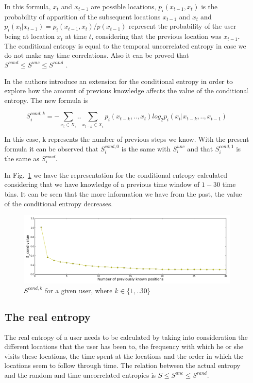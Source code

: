 In this formula, $x_{t}$ and $x_{t-1}$ are possible locations,
$p_{i}(x_{t-1},x_{t})$ is the probability of apparition of the subsequent
locations $x_{t-1}$ and $x_{t}$ and $p_{i}(x_{t}|x_{t-1}) = p_{i}(x_{t-1},x_{t})
/ p(x_{t-1})$ represent the probability of the user being at location $x_{t}$ at
time $t$, considering that the previous location was $x_{t-1}$. The conditional
entropy is equal to the temporal uncorrelated entropy in case we do not make any
time correlations. Also it can be proved that $S^{cond} \leq S^{unc} \leq
S^{rand}$ \cite{Cover:2006:EIT:1146355}.

In \cite{Sinatra14} the authors introduce an extension for the conditional
entropy in order to explore how the amount of previous knowledge affects the
value of the conditional entropy. The new formula is 

\begin{equation}
S_{i}^{cond,k} = - \sum\limits_{x_{t}\in X_{i}} .. \sum\limits_{x_{t-k}\in
X_{i}} p_{i}(x_{t-k},..,x_{t})log_{2}p_{i}(x_{t}|x_{t-k},..,x_{t-1})
\end{equation}

In this case, k represents the number of previous steps we know. With the
present formula it can be observed that $S_{i}^{cond,0}$ is the same with
$S_{i}^{unc}$ and that $S_{i}^{cond,1}$ is the same as $S_{i}^{cond}$.

In Fig.~\ref{conditional_e} we have the representation for the conditional
entropy calculated considering that we have knowledge of a previous time window
of $1 - 30$ time bins. It can be seen that the more information we have from the
past, the value of the conditional entropy decreases.

\begin{figure}[!h]
\centering
\includegraphics[width=\textwidth]{figures/entro_pred/constr.png}
\caption{$S^{cond,k}$ for a given user, where $ k \in \{1,..30\}$}
\label{conditional_e}
\end{figure}

\subsection{The real entropy}
The real entropy of a user needs to be calculated by taking into consideration
the different locations that the user has been to, the frequency with which he
or she visits these locations, the time spent at the locations and the order in
which the locations seem to follow through time. The relation between the actual
entropy and the random and time uncorrelated entropies is $S \leq S^{unc}
\leq S^{rand}$. 

